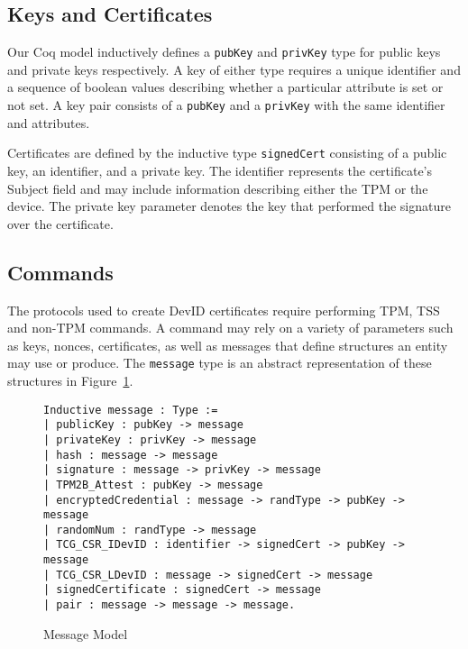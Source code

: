 \documentclass[runningheads]{llncs}
\begin{document}
\subsection{Keys and Certificates}

Our Coq model inductively defines a \verb|pubKey| and \verb|privKey|
type for public keys and private keys respectively. A key of either
type requires a unique identifier and a sequence of boolean values
describing whether a particular attribute is set or not set. A key
pair consists of a \verb|pubKey| and a \verb|privKey| with the same
identifier and attributes.



Certificates are defined by the inductive type \verb|signedCert|
consisting of a public key, an identifier, and a private key. The
identifier represents the certificate's Subject field and may include
information describing either the TPM or the device. The private key
parameter denotes the key that performed the signature over the
certificate.



\subsection{Commands}

The protocols used to create DevID certificates require performing
TPM, TSS and non-TPM commands. A command may rely on a variety of
parameters such as keys, nonces, certificates, as well as messages
that define structures an entity may use or produce. The
\verb|message| type is an abstract representation of these structures
in Figure~\ref{fig:message-model}.

\begin{figure}[hbtp]
\begin{lstlisting}[language=Coq]
Inductive message : Type :=
| publicKey : pubKey -> message
| privateKey : privKey -> message
| hash : message -> message
| signature : message -> privKey -> message
| TPM2B_Attest : pubKey -> message
| encryptedCredential : message -> randType -> pubKey -> message
| randomNum : randType -> message
| TCG_CSR_IDevID : identifier -> signedCert -> pubKey -> message
| TCG_CSR_LDevID : message -> signedCert -> message
| signedCertificate : signedCert -> message
| pair : message -> message -> message.
\end{lstlisting}
\caption{Message Model}
\label{fig:message-model}
\end{figure}
\end{document}
